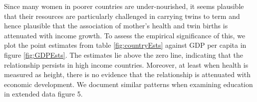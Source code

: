 \documentclass{nature}
\begin{document}
\begin{linenumbers}
Since many women in poorer countries are under-nourished, it seems plausible that their resources are particularly challenged in carrying twins to term and hence plausible that the association of mother's health and twin births is attenuated with income growth. To assess the empirical significance of this, we plot the point estimates from table \ref{fig:countryEsts} against GDP per capita in figure \ref{fig:GDPEsts}. The estimates lie above the zero line, indicating that the relationship persists in high income countries. Moreover, at least when health is measured as height, there is no evidence that the relationship is attenuated with economic development. %
We document similar patterns when examining education in extended data figure 5. 





\end{linenumbers}
\end{document}
